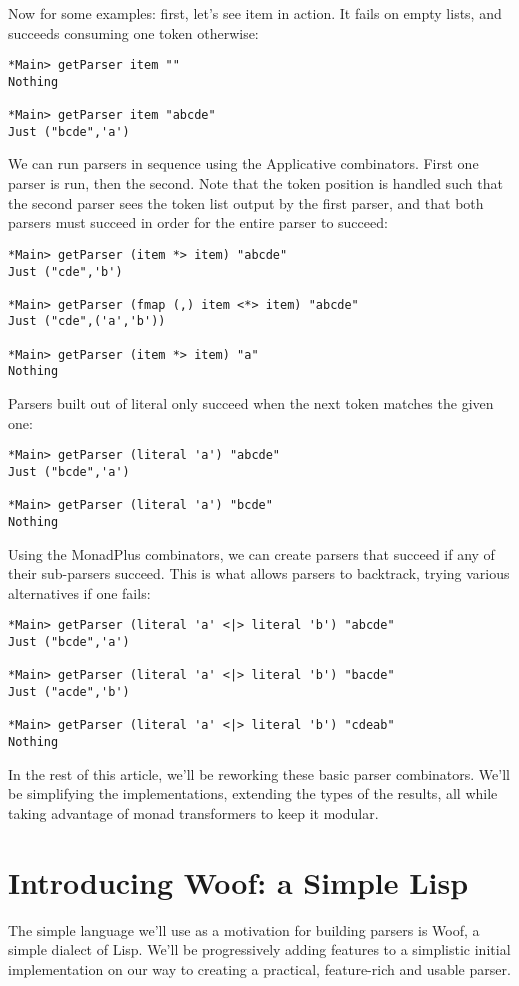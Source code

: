 \documentclass{tmr}
\begin{document}
Now for some examples:  first, let's see item in action.  It fails on empty lists,
and succeeds consuming one token otherwise:
\begin{verbatim}
*Main> getParser item ""
Nothing

*Main> getParser item "abcde"
Just ("bcde",'a')
\end{verbatim}
We can run parsers in sequence using the Applicative combinators.  First one parser
is run, then the second.  Note that the token position is handled such that the
second parser sees the token list output by the first parser, and that both parsers
must succeed in order for the entire parser to succeed:
\begin{verbatim}
*Main> getParser (item *> item) "abcde"
Just ("cde",'b')

*Main> getParser (fmap (,) item <*> item) "abcde"
Just ("cde",('a','b'))

*Main> getParser (item *> item) "a"
Nothing
\end{verbatim}
Parsers built out of literal only succeed when the next token matches the given
one:
\begin{verbatim}
*Main> getParser (literal 'a') "abcde"
Just ("bcde",'a')

*Main> getParser (literal 'a') "bcde"
Nothing
\end{verbatim}
Using the MonadPlus combinators, we can create parsers that succeed if any of
their sub-parsers succeed.  This is what allows parsers to backtrack, trying
various alternatives if one fails:
\begin{verbatim}
*Main> getParser (literal 'a' <|> literal 'b') "abcde"
Just ("bcde",'a')

*Main> getParser (literal 'a' <|> literal 'b') "bacde"
Just ("acde",'b')

*Main> getParser (literal 'a' <|> literal 'b') "cdeab"
Nothing
\end{verbatim}
In the rest of this article, we'll be reworking these basic parser combinators.
We'll be simplifying the implementations, extending the types of the results,
all while taking advantage of monad transformers to keep it modular.



\section{Introducing Woof:  a Simple Lisp}
The simple language we'll use as a motivation for building parsers is 
Woof, a simple dialect of Lisp.  We'll be 
progressively adding features to a simplistic initial implementation
on our way to creating a practical, feature-rich and usable parser.
\end{document}
